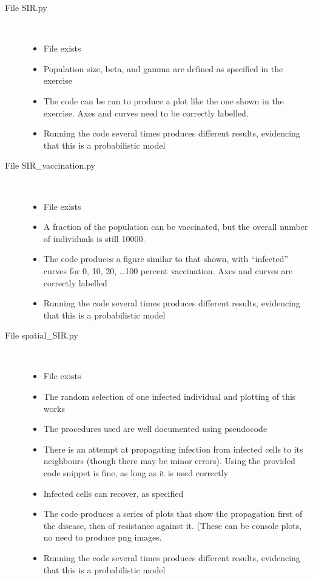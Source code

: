 \documentclass[pdflatex,a4paper]{article}
\begin{document}
\begin{description}
\item[File SIR.py] $\;$\\

\begin{itemize}
\item
File exists
\item
Population size, beta, and gamma are defined as specified in the exercise 
\item
The code can be run to produce a plot like the one shown in the exercise. Axes and curves need to be correctly labelled.
\item
Running the code several times produces different results, evidencing that this is a probabilistic model 
\end{itemize}

\item[File SIR\_vaccination.py]$\;$\\

\begin{itemize}
\item
File exists
\item 
A fraction of the population can be vaccinated, but the overall number of individuals is still 10000.
\item
The code produces a figure similar to that shown, with ``infected'' curves for 0, 10, 20, \dots 100 percent vaccination. Axes and curves are correctly labelled
\item
Running the code several times produces different results, evidencing that this is a probabilistic model
\end{itemize}
\item[File spatial\_SIR.py]$\;$\\

\begin{itemize}
\item
File exists
\item
The random selection of one infected individual and plotting of this works
\item
The procedures used are well documented using pseudocode
\item
There is an attempt at propagating infection from infected cells to its neighbours (though there may be minor errors). Using the provided code snippet is fine, as long as it is used correctly
\item
Infected cells can recover, as specified
\item
The code produces a series of plots that show the propagation first of the disease, then of resistance against it. (These can be console plots, no need to produce png images.
\item
Running the code several times produces different results, evidencing that this is a probabilistic model
\end{itemize}


\end{description}
\end{document}
